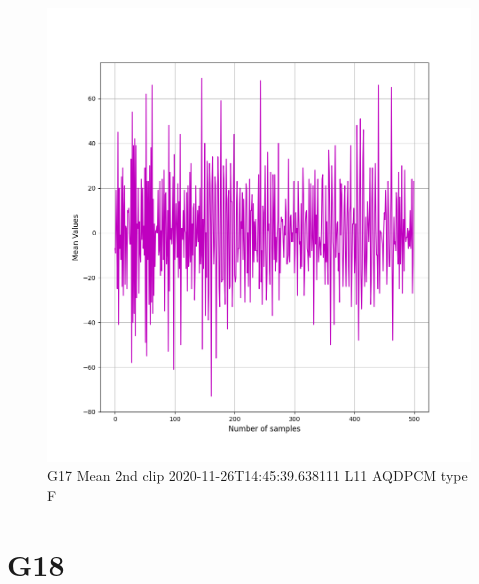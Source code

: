 \documentclass[hidelinks, 12pt, a4paper]{article}
\begin{document}
\begin{figure}[h!]
\centering
	\includegraphics[height=.38\textheight, width=\textwidth]{assets/session1/g17.png}
    \caption{G17 Mean 2nd clip  2020-11-26T14:45:39.638111 L11 AQDPCM type F}
\end{figure}



\section{G18}
\end{document}
